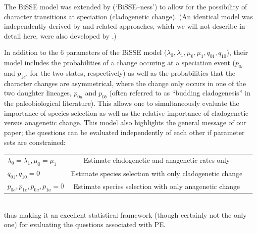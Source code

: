 The BiSSE model was extended by \citet{MagnusonFord2012} (`BiSSE--ness') to allow for the possibility of character transitions at speciation (cladogenetic change). (An identical model was independently derived by \citet{Goldberg2012} and related approaches, which we will not describe in detail here, were also developed by \citealt{Bokma2002, Bokma2008, Bokma2010}.) 


In addition to the 6 parameters of the BiSSE model ($\lambda_0, \lambda_1, \mu_0, \mu_1, q_{01}, q_{10}$), their model includes the probabilities of a change occuring at a speciation event ($p_{0c}$ and $p_{1c}$, for the two states, respectively) as well as the probabilities that the character changes are asymmetrical, where the change only occurs in one of the two daughter lineages, $p_{0a}$ and $p_{0b}$ (often referred to as ``budding cladogenesis'' in the paleobiological literature). This allows one to simultaneously evaluate the importance of species selection as well as the relative importance of cladogenetic versus anagenetic change. This model also highlights the general message of our paper; the questions can be evaluated independently of each other if parameter sets are constrained:

\begin{tabular}{ l c r }
  $\lambda_0 = \lambda_1, \mu_0 = \mu_1$ & Estimate cladogenetic and anagenetic rates only \\
  $q_{01}, q_{10} = \text{0}$ & Estimate species selection with only cladogenetic change \\
  $p_{0c}, p_{1c}, p_{0a}, p_{1a} = \text{0}$ & Estimate species selection with only anagenetic change\\
\end{tabular}\\

thus making it an excellent statistical framework (though certainly not the only one) for evaluating the questions associated with PE.


